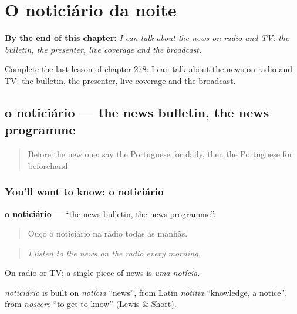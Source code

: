 
\chapter{O noticiário da noite}
\label{ch:pt-o-noticiario-da-noite}

\begin{chapteropening}
\textbf{By the end of this chapter:} \emph{I can talk about the news on radio and TV: the bulletin, the presenter, live coverage and the broadcast.}

Complete the last lesson of chapter 278: I can talk about the news on radio and TV: the bulletin, the presenter, live coverage and the broadcast.
\end{chapteropening}

\section[o noticiário]{o noticiário — the news bulletin, the news programme}

\label{lesson:PT-C278-noticiario}



\begin{quote}
Before the new one: say the Portuguese for daily, then the Portuguese for beforehand.
\end{quote}

\subsection*{You'll want to know: o noticiário}
\textbf{o noticiário} — \textquotedblleft{}the news bulletin, the news programme\textquotedblright{}.

\begin{quote}
Ouço o noticiário na rádio todas as manhãs.
\end{quote}

\begin{quote}
\emph{I listen to the news on the radio every morning.}
\end{quote}

On radio or TV; a single piece of news is \emph{uma notícia}.

\begin{cousinweb}
\emph{noticiário} is built on \emph{notícia} \textquotedblleft{}news\textquotedblright{}, from Latin \emph{nōtitia} \textquotedblleft{}knowledge, a notice\textquotedblright{}, from \emph{nōscere} \textquotedblleft{}to get to know\textquotedblright{} (Lewis \& Short).
\end{cousinweb}

